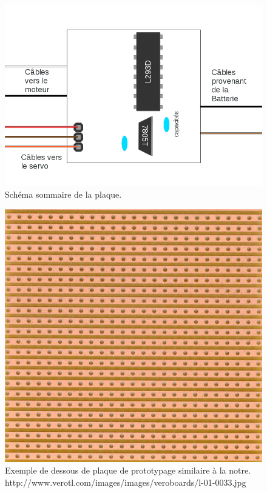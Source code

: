 \documentclass[a4paper,12pt]{report}
\begin{document}
{\begin{figure}[h]
\centering
\includegraphics[width=1.0\textwidth]{figures/SchemaPlaqueMaison}
    \caption{\label{SchemaPlaqueMaison}Schéma sommaire de la plaque.
    }
\end{figure}

\begin{figure}[h]
\centering
\includegraphics[width=1.0\textwidth]{figures/StripBoard}
    \caption{\label{StripBoard}Exemple de dessous de plaque de prototypage
      similaire à la notre. http://www.verotl.com/images/images/veroboards/l-01-0033.jpg
    }
\end{figure}

}
\end{document}
